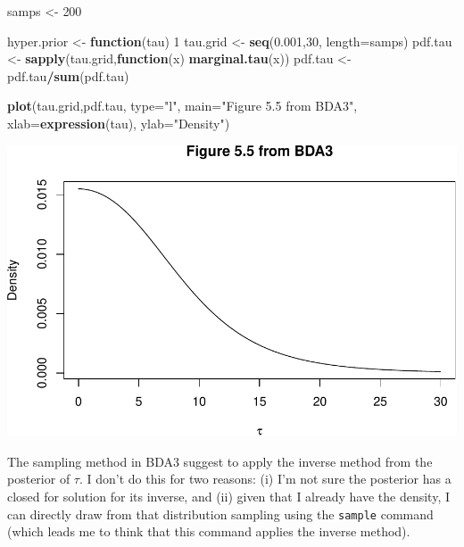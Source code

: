 \documentclass[]{article}
\newenvironment{Shaded}{\begin{snugshade}}{\end{snugshade}}
\newcommand{\KeywordTok}[1]{\textcolor[rgb]{0.13,0.29,0.53}{\textbf{#1}}}
\newcommand{\DataTypeTok}[1]{\textcolor[rgb]{0.13,0.29,0.53}{#1}}
\newcommand{\DecValTok}[1]{\textcolor[rgb]{0.00,0.00,0.81}{#1}}
\newcommand{\FloatTok}[1]{\textcolor[rgb]{0.00,0.00,0.81}{#1}}
\newcommand{\StringTok}[1]{\textcolor[rgb]{0.31,0.60,0.02}{#1}}
\newcommand{\ControlFlowTok}[1]{\textcolor[rgb]{0.13,0.29,0.53}{\textbf{#1}}}
\newcommand{\OperatorTok}[1]{\textcolor[rgb]{0.81,0.36,0.00}{\textbf{#1}}}
\newcommand{\NormalTok}[1]{#1}
\begin{document}
\begin{Shaded}
\begin{Highlighting}[]
\NormalTok{samps           <-}\StringTok{ }\DecValTok{200} 

\NormalTok{hyper.prior     <-}\StringTok{  }\ControlFlowTok{function}\NormalTok{(tau) }\DecValTok{1}
\NormalTok{tau.grid        <-}\StringTok{  }\KeywordTok{seq}\NormalTok{(}\FloatTok{0.001}\NormalTok{,}\DecValTok{30}\NormalTok{, }\DataTypeTok{length=}\NormalTok{samps)}
\NormalTok{pdf.tau         <-}\StringTok{  }\KeywordTok{sapply}\NormalTok{(tau.grid,}\ControlFlowTok{function}\NormalTok{(x) }\KeywordTok{marginal.tau}\NormalTok{(x))}
\NormalTok{pdf.tau         <-}\StringTok{  }\NormalTok{pdf.tau}\OperatorTok{/}\KeywordTok{sum}\NormalTok{(pdf.tau)}

\KeywordTok{plot}\NormalTok{(tau.grid,pdf.tau, }\DataTypeTok{type=}\StringTok{"l"}\NormalTok{, }
     \DataTypeTok{main=}\StringTok{"Figure 5.5 from BDA3"}\NormalTok{, }
     \DataTypeTok{xlab=}\KeywordTok{expression}\NormalTok{(tau), }
     \DataTypeTok{ylab=}\StringTok{"Density"}\NormalTok{)}
\end{Highlighting}
\end{Shaded}

\includegraphics{Untitled_files/figure-latex/unnamed-chunk-8-1.pdf}

The sampling method in BDA3 suggest to apply the inverse method from the
posterior of \(\tau\). I don't do this for two reasons: (i) I'm not sure
the posterior has a closed for solution for its inverse, and (ii) given
that I already have the density, I can directly draw from that
distribution sampling using the \texttt{sample} command (which leads me
to think that this command applies the inverse method).
\end{document}
